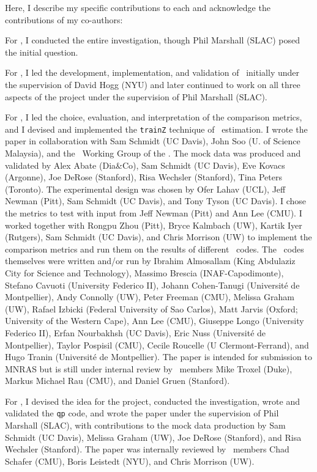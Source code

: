 Here, I describe my specific contributions to each \chapname and acknowledge the contributions of my co-authors:
\begin{enumerate}

{\item For , I conducted the entire investigation, though Phil Marshall (SLAC) posed the initial question.}

{\item For , I led the development, implementation, and validation of \Chippr\ initially under the supervision of David Hogg (NYU) and later continued to work on all three aspects of the project under the supervision of Phil Marshall (SLAC).}

{\item For , I led the choice, evaluation, and interpretation of the comparison metrics, and I devised and implemented the \texttt{trainZ} technique of \pzpdf\ estimation.
	I wrote the paper in collaboration with Sam Schmidt (UC Davis), John Soo (U. of Science Malaysia), and the \Pz\ Working Group of the \desc.  
	The mock data was produced and validated by Alex Abate (Dia\&Co), Sam Schmidt (UC Davis), Eve Kovacs (Argonne), Joe DeRose (Stanford), Risa Wechsler (Stanford), Tina Peters (Toronto).
	The experimental design was chosen by Ofer Lahav (UCL), Jeff Newman (Pitt), Sam Schmidt (UC Davis), and Tony Tyson (UC Davis).
	I chose the metrics to test with input from Jeff Newman (Pitt) and Ann Lee (CMU).
	I worked together with Rongpu Zhou (Pitt), Bryce Kalmbach (UW), Kartik Iyer (Rutgers), Sam Schmidt (UC Davis), and Chris Morrison (UW) to implement the comparison metrics and run them on the results of different \pzpdf\ codes.
	The \pzpdf\ codes themselves were written and/or run by Ibrahim Almosallam (King Abdulaziz City for Science and Technology), Massimo Brescia (INAF-Capodimonte), Stefano Cavuoti (University Federico II), Johann Cohen-Tanugi (Universit\'e de Montpellier),  Andy Connolly (UW), Peter Freeman (CMU), Melissa Graham (UW), Rafael Izbicki (Federal University of Sao Carlos), Matt Jarvis (Oxford; University of the Western Cape), Ann Lee (CMU), Giuseppe Longo (University Federico II), Erfan Nourbakhsh (UC Davis), Eric Nuss (Universit\'e de Montpellier), Taylor Pospisil (CMU), Cecile Roucelle (U Clermont-Ferrand), and Hugo Tranin (Universit\'e de Montpellier).
	The paper is intended for submission to MNRAS but is still under internal review by \desc\ members Mike Troxel (Duke), Markus Michael Rau (CMU), and Daniel Gruen (Stanford).}

{\item For , I devised the idea for the project, conducted the investigation, wrote and validated the \texttt{qp} code, and wrote the paper under the supervision of Phil Marshall (SLAC), with contributions to the mock data production by Sam Schmidt (UC Davis), Melissa Graham (UW), Joe DeRose (Stanford), and Risa Wechsler (Stanford).
	The paper was internally reviewed by \desc\ members Chad Schafer (CMU), Boris Leistedt (NYU), and Chris Morrison (UW).}

\end{enumerate}
